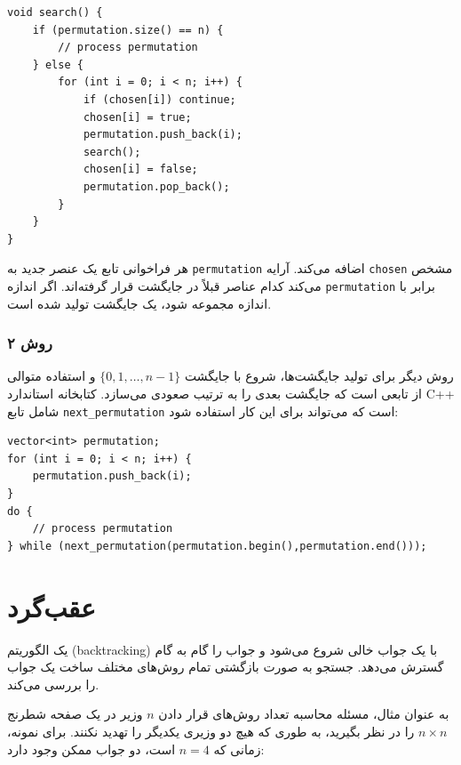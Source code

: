 \begin{lstlisting}
void search() {
    if (permutation.size() == n) {
        // process permutation
    } else {
        for (int i = 0; i < n; i++) {
            if (chosen[i]) continue;
            chosen[i] = true;
            permutation.push_back(i);
            search();
            chosen[i] = false;
            permutation.pop_back();
        }
    }
}
\end{lstlisting}

هر فراخوانی تابع یک عنصر جدید به \texttt{permutation} اضافه می‌کند.
آرایه \texttt{chosen} مشخص می‌کند کدام عناصر قبلاً در جایگشت قرار گرفته‌اند.
اگر اندازه \texttt{permutation} برابر با اندازه مجموعه شود، یک جایگشت تولید شده است.

\subsubsection{روش ۲}


روش دیگر برای تولید جایگشت‌ها، شروع با جایگشت $\{0,1,\ldots,n-1\}$ و استفاده متوالی از تابعی است که جایگشت بعدی را به ترتیب صعودی می‌سازد.
کتابخانه استاندارد C++ شامل تابع \texttt{next\_permutation} است که می‌تواند برای این کار استفاده شود:

\begin{lstlisting}
vector<int> permutation;
for (int i = 0; i < n; i++) {
    permutation.push_back(i);
}
do {
    // process permutation
} while (next_permutation(permutation.begin(),permutation.end()));
\end{lstlisting}

\section{عقب‌گرد}


یک الگوریتم  (backtracking) با یک جواب خالی شروع می‌شود و جواب را گام به گام گسترش می‌دهد.
جستجو به صورت بازگشتی تمام روش‌های مختلف ساخت یک جواب را بررسی می‌کند.


به عنوان مثال، مسئله محاسبه تعداد روش‌های قرار دادن $n$ وزیر در یک صفحه شطرنج $n \times n$ را در نظر بگیرید، به طوری که هیچ دو وزیری یکدیگر را تهدید نکنند.
برای نمونه، زمانی که $n=4$ است، دو جواب ممکن وجود دارد:

\begin{center}
\end{center}

